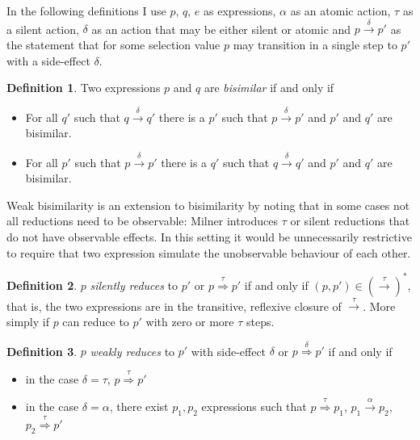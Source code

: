 \documentclass[12pt,twoside,notitlepage]{report}
\theoremstyle{plain}%
\theoremstyle{definition}
\newtheorem{defn}{Definition}[section]
\theoremstyle{remark}
\begin{document}
In the following definitions I use $ p,\, q,\, e $ as expressions, $ \alpha $ as an atomic action, $ \tau $ as a silent action, $ \delta $ as an action that may be either silent or atomic and $ p \overset{\delta}{\rightarrow} p' $ as the statement that for some selection value $ p $ may transition in a single step to $ p' $ with a side-effect $ \delta $.

\begin{defn}
Two expressions $ p $ and $ q $ are \textit{bisimilar} if and only if
\begin{itemize}
\item{For all $ q' $ such that $ q \overset{\delta}{\rightarrow} q' $ there is a $ p' $ such that $ p \overset{\delta}{\rightarrow} p' $ and $ p' $ and $ q' $ are bisimilar. }
\item{For all $ p' $ such that $ p \overset{\delta}{\rightarrow} p' $ there is a $ q' $ such that $ q \overset{\delta}{\rightarrow} q' $ and $ p' $ and $ q' $ are bisimilar. }
\end{itemize}
\end{defn}

Weak bisimilarity is an extension to bisimilarity by noting that in some cases not all reductions need to be observable: Milner\cite{milner1982calculus} introduces $ \tau $ or silent reductions that do not have observable effects. In this setting it would be unnecessarily restrictive to require that two expression simulate the unobservable behaviour of each other. 

\begin{defn}
$ p $ \textit{silently reduces} to $ p' $ or $ p \overset{\tau}{\Rightarrow} p' $ if and only if $ (p, p') \in \left(\overset{\tau}{\rightarrow}\right)^* $, that is, the two expressions are in the transitive, reflexive closure of $ \overset{\tau}{\rightarrow} $. More simply if $ p $ can reduce to $ p' $ with zero or more $ \tau $ steps.
\end{defn}

\begin{defn}
$ p $ \textit{weakly reduces} to $ p' $ with side-effect $ \delta $ or $ p \overset{\delta}{\Rightarrow} p' $ if and only if 
\begin{itemize}
\item{in the case $ \delta = \tau $, $ p \overset{\tau}{\Rightarrow} p' $}
\item{in the case $ \delta = \alpha $, there exist $ p_1, p_2 $ expressions such that $ p \overset{\tau}{\Rightarrow} p_1 $, $ p_1 \overset{\alpha}{\rightarrow} p_2 $, $ p_2 \overset{\tau}{\Rightarrow} p' $}
\end{itemize}
\end{defn}
\end{document}
